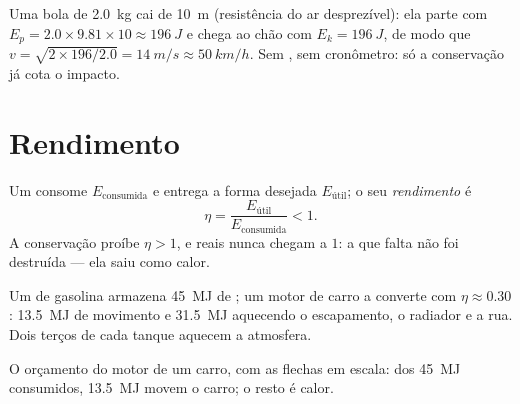 \begin{example}\label{ex:g10:energy-conservation:fall}
Uma bola de \qty{2.0}{kg} cai de \qty{10}{m} (resistência do ar
desprezível): ela parte com
$E_p = 2.0 \times 9.81 \times 10 \approx \qty{196}{J}$ e chega ao chão
com $E_k = \qty{196}{J}$, de modo que
$v = \sqrt{2 \times 196/2.0} = \qty{14}{m/s} \approx \qty{50}{km/h}$. Sem
, sem cronômetro: só a conservação já cota o impacto.
\end{example}

\section{Rendimento}

\begin{definition}[Rendimento]\label{def:g10:energy-conservation:efficiency}
Um  consome $E_{\text{consumida}}$ e entrega a forma desejada
$E_{\text{útil}}$; o seu \emph{rendimento} é
\[
\eta = \frac{E_{\text{útil}}}{E_{\text{consumida}}} < 1 .
\]
A conservação proíbe $\eta > 1$, e  reais nunca chegam a $1$:
a  que falta não foi destruída --- ela saiu como calor.
\end{definition}

\begin{example}\label{ex:g10:energy-conservation:engine}
Um  de gasolina armazena \qty{45}{MJ} de ; um
motor de carro a converte com $\eta \approx 0.30$: \qty{13.5}{MJ} de
movimento e \qty{31.5}{MJ} aquecendo o escapamento, o radiador e a rua.
Dois terços de cada tanque aquecem a atmosfera.
\end{example}

\begin{omfigure}

{\small O orçamento do motor de um carro, com as flechas em escala: dos
\qty{45}{MJ} consumidos, \qty{13.5}{MJ} movem o carro; o resto é calor.}
\end{omfigure}

